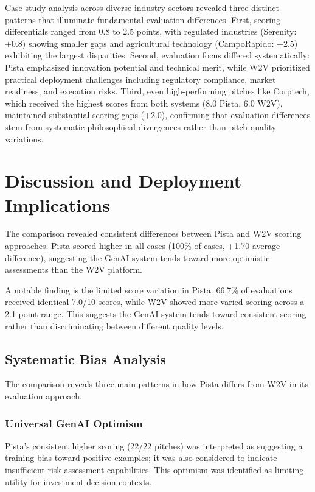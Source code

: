 Case study analysis across diverse industry sectors revealed three distinct patterns that illuminate fundamental evaluation differences. First, scoring differentials ranged from 0.8 to 2.5 points, with regulated industries (Serenity: +0.8) showing smaller gaps and agricultural technology (CampoRapido: +2.5) exhibiting the largest disparities. Second, evaluation focus differed systematically: Pista emphasized innovation potential and technical merit, while W2V prioritized practical deployment challenges including regulatory compliance, market readiness, and execution risks. Third, even high-performing pitches like Corptech, which received the highest scores from both systems (8.0 Pista, 6.0 W2V), maintained substantial scoring gaps (+2.0), confirming that evaluation differences stem from systematic philosophical divergences rather than pitch quality variations.

\section{Discussion and Deployment Implications}

The comparison revealed consistent differences between Pista and W2V scoring approaches. Pista scored higher in all cases (100\% of cases, +1.70 average difference), suggesting the GenAI system tends toward more optimistic assessments than the W2V platform.

A notable finding is the limited score variation in Pista: 66.7\% of evaluations received identical 7.0/10 scores, while W2V showed more varied scoring across a 2.1-point range. This suggests the GenAI system tends toward consistent scoring rather than discriminating between different quality levels.

\subsection{Systematic Bias Analysis}
\label{sec:bias-analysis}

The comparison reveals three main patterns in how Pista differs from W2V in its evaluation approach.

\subsubsection{Universal GenAI Optimism}
\label{subsec:optimism}

Pista's consistent higher scoring (22/22 pitches) was interpreted as suggesting a training bias toward positive examples; it was also considered to indicate insufficient risk assessment capabilities. This optimism was identified as limiting utility for investment decision contexts.


